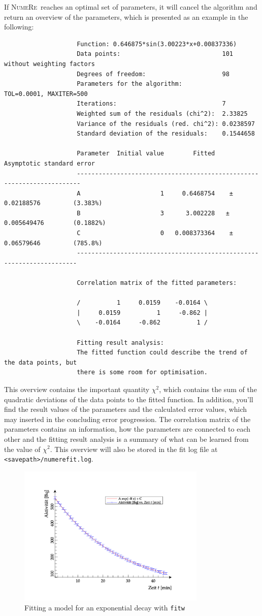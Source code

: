 \documentclass[DIV=14,headsepline,footsepline]{scrbook}
\newcommand{\NR}{\textsc{Nu\-me\-Re}}
\begin{document}
				If \NR\ reaches an optimal set of parameters, it will cancel the algorithm and return an overview of the parameters, which is presented as an example in the following:
				\begin{verbatim}
					Function: 0.646875*sin(3.00223*x+0.00837336)
					Data points:                            101 without weighting factors
					Degrees of freedom:                     98
					Parameters for the algorithm:           TOL=0.0001, MAXITER=500
					Iterations:                             7
					Weighted sum of the residuals (chi^2):  2.33825
					Variance of the residuals (red. chi^2): 0.0238597
					Standard deviation of the residuals:    0.1544658

					Parameter  Initial value        Fitted        Asymptotic standard error
					-----------------------------------------------------------------------
					A                      1     0.6468754    ± 0.02188576         (3.383%)
					B                      3      3.002228   ± 0.005649476        (0.1882%)
					C                      0   0.008373364    ± 0.06579646         (785.8%)
					----------------------------------------------------------------------

					Correlation matrix of the fitted parameters:

					/          1     0.0159    -0.0164 \
					|     0.0159          1     -0.862 |
					\    -0.0164     -0.862          1 /

					Fitting result analysis:
					The fitted function could describe the trend of the data points, but 
					there is some room for optimisation.
				\end{verbatim}
				This overview contains the important quantity $\chi^2$, which contains the sum of the quadratic deviations of the data points to the fitted function. In addition, you'll find the result values of the parameters and the calculated error values, which may inserted in the concluding error progression. The correlation matrix of the parameters contains an information, how the parameters are connected to each other and the fitting result analysis is a summary of what can be learned from the value of $\chi^2$. This overview will also be stored in the fit log file at \verb+<savepath>/numerefit.log+.
				\begin{figure}[htb]%
					\centering
					\includegraphics[width=0.8\textwidth]{_graphics/plot.png}
					\caption{Fitting a model for an exponential decay with \lstinline{fitw}}
					\label{fig:fit}
				\end{figure}
\end{document}
